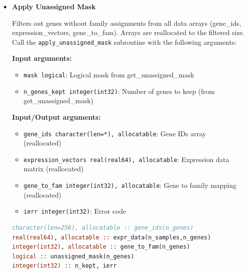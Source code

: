 \documentclass[11pt]{article}
\begin{document}
\begin{enumerate}
\begin{itemize}
\begin{lstlisting}[language=Fortran, caption={Create Unassigned Genes Mask}]
call get_unassigned_mask(gene_to_fam, unassigned_mask, n_kept)
! unassigned_mask(i) = .true. if gene i has family assignment
! n_kept = count of genes with family assignments
	      	      \end{lstlisting}
	      	      
	      	\item \textbf{Apply Unassigned Mask}
	      	      
	      	      Filters out genes without family assignments from all data arrays (gene\_ids,
	      	      expression\_vectors, gene\_to\_fam). Arrays are reallocated to the
	      	      filtered size. Call the \texttt{apply\_unassigned\_mask} subroutine
	      	      with the following arguments:
	      	      
	      	      \textbf{Input arguments:}
	      	      \begin{itemize}
	      	      	\item \texttt{mask logical}: Logical mask from get\_unassigned\_mask
	      	      	      
	      	      	\item \texttt{n\_genes\_kept integer(int32)}: Number of genes to keep
	      	      	      (from get\_unassigned\_mask)
	      	      \end{itemize}
	      	      \textbf{Input/Output arguments:}
	      	      \begin{itemize}
	      	      	\item \texttt{gene\_ids character(len=*), allocatable}: Gene IDs array
	      	      	      (reallocated)
	      	      	      
	      	      	\item \texttt{expression\_vectors real(real64), allocatable}: Expression
	      	      	      data matrix (reallocated)
	      	      	      
	      	      	\item \texttt{gene\_to\_fam integer(int32), allocatable}: Gene to family
	      	      	      mapping (reallocated)
	      	      	      
	      	      	\item \texttt{ierr integer(int32)}: Error code
	      	      \end{itemize}
	      	      \begin{lstlisting}[language=Fortran, caption={Filter Unassigned Genes}]
character(len=256), allocatable :: gene_ids(n_genes)
real(real64), allocatable :: expr_data(n_samples,n_genes)
integer(int32), allocatable :: gene_to_fam(n_genes)
logical :: unassigned_mask(n_genes)
integer(int32) :: n_kept, ierr


\end{lstlisting}
\end{itemize}
\end{enumerate}
\end{document}
